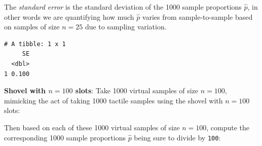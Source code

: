 \documentclass[12pt,]{krantz}
\makeatletter
\newenvironment{Shaded}{\begin{snugshade}}{\end{snugshade}}
\newcommand{\KeywordTok}[1]{\textcolor[rgb]{0.27,0.27,0.27}{\textbf{#1}}}
\newcommand{\DataTypeTok}[1]{\textcolor[rgb]{0.27,0.27,0.27}{#1}}
\newcommand{\DecValTok}[1]{\textcolor[rgb]{0.06,0.06,0.06}{#1}}
\newcommand{\StringTok}[1]{\textcolor[rgb]{0.5,0.5,0.5}{#1}}
\newcommand{\OperatorTok}[1]{\textcolor[rgb]{0.43,0.43,0.43}{\textbf{#1}}}
\newcommand{\NormalTok}[1]{#1}
\newenvironment{kframe}{%
\medskip{}
\setlength{\fboxsep}{.8em}
 \def\at@end@of@kframe{}%
 \ifinner\ifhmode%
  \def\at@end@of@kframe{\end{minipage}}%
  \begin{minipage}{\columnwidth}%
 \fi\fi%
 \def\FrameCommand##1{\hskip\@totalleftmargin \hskip-\fboxsep
 \colorbox{shadecolor}{##1}\hskip-\fboxsep
     \hskip-\linewidth \hskip-\@totalleftmargin \hskip\columnwidth}%
 \MakeFramed {\advance\hsize-\width
   \@totalleftmargin\z@ \linewidth\hsize
   \@setminipage}}%
 {\par\unskip\endMakeFramed%
 \at@end@of@kframe}
\renewenvironment{Shaded}{\begin{kframe}}{\end{kframe}}
\makeatother
\begin{document}
\begin{Shaded}
\end{Shaded}

The \emph{standard error} is the standard deviation of the 1000 sample
proportions \(\widehat{p}\), in other words we are quantifying how much
\(\widehat{p}\) varies from sample-to-sample based on samples of size
\(n=25\) due to sampling variation.

\begin{Shaded}
\end{Shaded}

\begin{verbatim}
# A tibble: 1 x 1
     SE
  <dbl>
1 0.100
\end{verbatim}

\textbf{Shovel with \(n=100\) slots}: Take 1000 virtual samples of size
\(n=100\), mimicking the act of taking 1000 tactile samples using the
shovel with \(n=100\) slots:

\begin{Shaded}
\end{Shaded}

Then based on each of these 1000 virtual samples of size \(n=100\),
compute the corresponding 1000 sample proportions \(\widehat{p}\) being
sure to divide by \texttt{100}:
\end{document}

